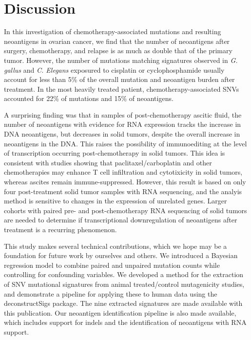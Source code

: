\section*{Discussion}

In this investigation of chemotherapy-associated mutations and resulting neoantigens in ovarian cancer, we find that the number of neoantigens after surgery, chemotherapy, and relapse is as much as double that of the primary tumor. However, the number of mutations matching signatures observed in \textit{G. gallus} and \textit{C. Elegans} exposured to cisplatin or cyclophosphamide usually account for less than 5\% of the overall mutation and neoantigen burden after treatment. In the most heavily treated patient, chemotherapy-associated SNVs accounted for 22\% of mutations and 15\% of neoantigens.

A surprising finding was that in samples of post-chemotherapy ascitic fluid, the number of neoantigens with evidence for RNA expression tracks the increase in DNA neoantigens, but decreases in solid tumors, despite the overall increase in neoantigens in the DNA. This raises the possibility of immunoediting\cite{Dunn_2002} at the level of transcription occurring post-chemotherapy in solid tumors. This idea is consistent with studies showing that paclitaxel/carboplatin and other chemotherapies may enhance T cell infiltration and cytotixicity in solid tumors\cite{Demaria2001,Wu_2009,Pfannenstiel_2010,Hodge_2013}, whereas ascites remain immune-suppressed\cite{Giuntoli2009,Simpson-Abelson2013,Singel2016}. However, this result is based on only four post-treatment solid tumor samples with RNA sequencing, and the analyis method is sensitive to changes in the expression of unrelated genes. Larger cohorts with paired pre- and post-chemotherapy RNA sequencing of solid tumors are needed to determine if transcriptional downregulation of neoantigens after treatment is a recurring phenomenon.

This study makes several technical contributions, which we hope may be a foundation for future work by ourselves and others. We introduced a Bayesian regression model to combine paired and unpaired mutation counts while controlling for confounding variables. We developed a method for the extraction of SNV mutational signatures from animal treated/control mutagenicity studies, and demonstrate a pipeline for applying these to human data using the deconstructSigs package. The nine extracted signatures are made available with this publication. Our neoantigen identification pipeline is also made available, which includes support for indels and the identification of neoantigens with RNA support. 

